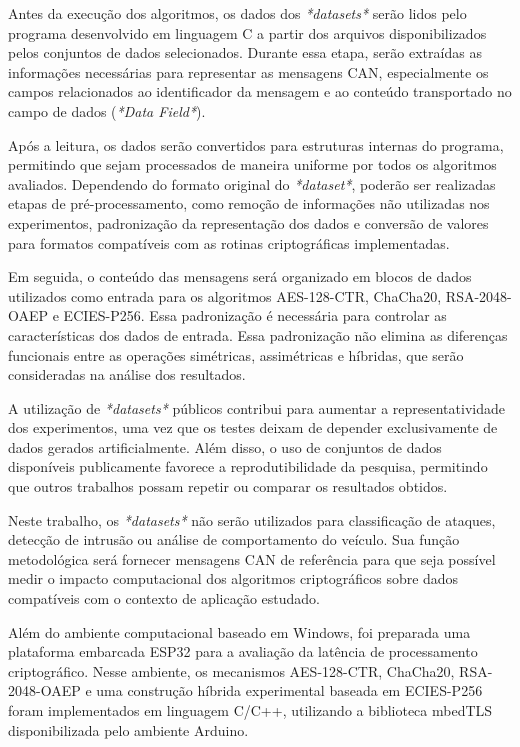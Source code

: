Antes da execução dos algoritmos, os dados dos \textit{*datasets*} serão lidos pelo programa desenvolvido em linguagem C a partir dos arquivos disponibilizados pelos conjuntos de dados selecionados. Durante essa etapa, serão extraídas as informações necessárias para representar as mensagens CAN, especialmente os campos relacionados ao identificador da mensagem e ao conteúdo transportado no campo de dados (\textit{*Data Field*}).

Após a leitura, os dados serão convertidos para estruturas internas do programa, permitindo que sejam processados de maneira uniforme por todos os algoritmos avaliados. Dependendo do formato original do \textit{*dataset*}, poderão ser realizadas etapas de pré-processamento, como remoção de informações não utilizadas nos experimentos, padronização da representação dos dados e conversão de valores para formatos compatíveis com as rotinas criptográficas implementadas.

Em seguida, o conteúdo das mensagens será organizado em blocos de dados utilizados como entrada para os algoritmos AES-128-CTR, ChaCha20, RSA-2048-OAEP e ECIES-P256. Essa padronização é necessária para controlar as características dos dados de entrada. Essa padronização não elimina as diferenças funcionais entre as operações simétricas, assimétricas e híbridas, que serão consideradas na análise dos resultados.

A utilização de \textit{*datasets*} públicos contribui para aumentar a representatividade dos experimentos, uma vez que os testes deixam de depender exclusivamente de dados gerados artificialmente. Além disso, o uso de conjuntos de dados disponíveis publicamente favorece a reprodutibilidade da pesquisa, permitindo que outros trabalhos possam repetir ou comparar os resultados obtidos.

Neste trabalho, os \textit{*datasets*} não serão utilizados para classificação de ataques, detecção de intrusão ou análise de comportamento do veículo. Sua função metodológica será fornecer mensagens CAN de referência para que seja possível medir o impacto computacional dos algoritmos criptográficos sobre dados compatíveis com o contexto de aplicação estudado.

Além do ambiente computacional baseado em Windows, foi preparada uma plataforma embarcada ESP32 para a avaliação da latência de processamento criptográfico. Nesse ambiente, os mecanismos AES-128-CTR, ChaCha20, RSA-2048-OAEP e uma construção híbrida experimental baseada em ECIES-P256 foram implementados em linguagem C/C++, utilizando a biblioteca mbedTLS disponibilizada pelo ambiente Arduino.

